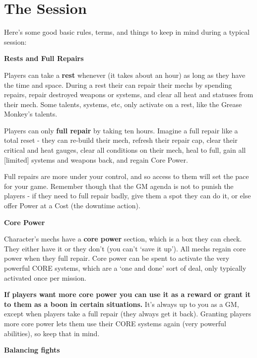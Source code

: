 \section{The Session}

Here's some good basic rules, terms, and things to keep in mind during a typical session:

\begin{center}
     \textbf{Rests and Full Repairs}
\end{center}

Players can take a \textbf{rest} whenever (it takes about an hour) as long as they have the time and
space. During a rest their can repair their mechs by spending repairs, repair destroyed weapons
or systems, and clear all heat and statuses from their mech. Some talents, systems, etc, only
activate on a rest, like the Grease Monkey's talents.

Players can only \textbf{full repair} by taking ten hours. Imagine a full repair like a total reset - they can
re-build their mech, refresh their repair cap, clear their critical and heat gauges, clear all
conditions on their mech, heal to full, gain all [limited] systems and weapons back, and regain
Core Power.

Full repairs are more under your control, and so access to them will set the pace for your game.
Remember though that the GM agenda is not to punish the players - if they need to full repair
badly, give them a spot they can do it, or else offer Power at a Cost (the downtime action).

\begin{center}
     \textbf{Core Power}
\end{center}

Character's mechs have a \textbf{core power} section, which is a box they can check. They either have
it or they don't (you can't `save it up'). All mechs regain core power when they full repair. Core
power can be spent to activate the very powerful CORE systems, which are a `one and done'
sort of deal, only typically activated once per mission.

\textbf{If players want more core power you can use it as a reward or grant it to them as a boon in
certain situations.} It's always up to you as a GM, except when players take a full repair (they
always get it back). Granting players more core power lets them use their CORE systems again
(very powerful abilities), so keep that in mind.

\begin{center}
     \textbf{Balancing fights}
\end{center}

